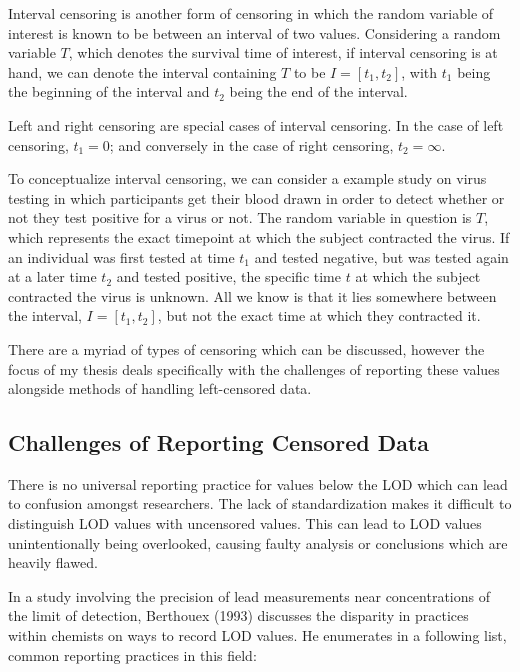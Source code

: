 \documentclass[
]{article}
\begin{document}
Interval censoring is another form of censoring in which the random
variable of interest is known to be between an interval of two values.
Considering a random variable \(T\), which denotes the survival time of
interest, if interval censoring is at hand, we can denote the interval
containing \(T\) to be \(I = [t_1, t_2]\), with \(t_1\) being the
beginning of the interval and \(t_2\) being the end of the interval.

Left and right censoring are special cases of interval censoring. In the
case of left censoring, \(t_1 = 0\); and conversely in the case of right
censoring, \(t_2 = \infty\).

To conceptualize interval censoring, we can consider a example study on
virus testing in which participants get their blood drawn in order to
detect whether or not they test positive for a virus or not. The random
variable in question is \(T\), which represents the exact timepoint at
which the subject contracted the virus. If an individual was first
tested at time \(t_1\) and tested negative, but was tested again at a
later time \(t_2\) and tested positive, the specific time \(t\) at which
the subject contracted the virus is unknown. All we know is that it lies
somewhere between the interval, \(I = [t_1, t_2]\), but not the exact
time at which they contracted it.

There are a myriad of types of censoring which can be discussed, however
the focus of my thesis deals specifically with the challenges of
reporting these values alongside methods of handling left-censored data.

\hypertarget{challenges}{%
\subsection{Challenges of Reporting Censored Data}\label{challenges}}

There is no universal reporting practice for values below the LOD which
can lead to confusion amongst researchers. The lack of standardization
makes it difficult to distinguish LOD values with uncensored values.
This can lead to LOD values unintentionally being overlooked, causing
faulty analysis or conclusions which are heavily flawed.

In a study involving the precision of lead measurements near
concentrations of the limit of detection, Berthouex (1993) discusses the
disparity in practices within chemists on ways to record LOD values. He
enumerates in a following list, common reporting practices in this
field:
\end{document}

